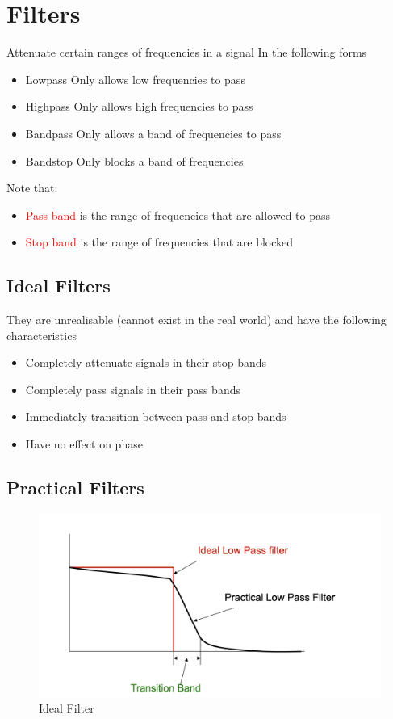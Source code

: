 \documentclass[oneside]{book}
\begin{document}
        \section{Filters}
            Attenuate certain ranges of frequencies in a signal
            In the following forms
            \begin{itemize}
                \item Lowpass
                    \subitem Only allows low frequencies to pass
                \item Highpass
                    \subitem Only allows high frequencies to pass
                \item Bandpass
                    \subitem Only allows a band of frequencies to pass
                \item Bandstop
                    \subitem Only blocks a band of frequencies
            \end{itemize}
            Note that:
            \begin{itemize}
                \item \textcolor{red}{Pass band} is the range of frequencies that are allowed to pass
                \item \textcolor{red}{Stop band} is the range of frequencies that are blocked
            \end{itemize}
            \subsection{Ideal Filters}
                They are unrealisable (cannot exist in the real world) and have the following characteristics
                \begin{itemize}
                    \item Completely attenuate signals in their stop bands
                    \item Completely pass signals in their pass bands
                    \item Immediately transition between pass and stop bands
                    \item Have no effect on phase
                \end{itemize}
            \subsection{Practical Filters}
                \begin{figure}[H]
                    \centering
                    \includegraphics[width=0.5\linewidth]{figures/practical_filter.png}
                    \caption{Ideal Filter}
                \end{figure}
\end{document}
